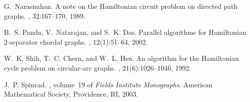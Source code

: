 \documentclass[a4paper,12pt]{article}
\theoremstyle{plain}
\theoremstyle{definition}
\theoremstyle{remark}
\begin{document}
\begin{thebibliography}{10}
G.~Narasimhan.
\newblock A note on the {H}amiltonian circuit problem on directed path graphs.
, 32:167--170, 1989.

B.~S. Panda, V.~Natarajan, and S.~K. Das.
\newblock Parallel algorithms for {H}amiltonian 2-separator chordal graphs.
, 12(1):51--64, 2002.

W.~K. Shih, T.~C. Chern, and W.~L. Hsu.
\newblock An {} algorithm for the {H}amiltonian cycle problem
  on circular-arc graphs.
, 21(6):1026--1046, 1992.

J.~P. Spinrad.
, volume~19 of {\em Fields
  Institute Monographs}.
\newblock American Mathematical Society, Providence, RI, 2003.

\end{thebibliography}
\end{document}
